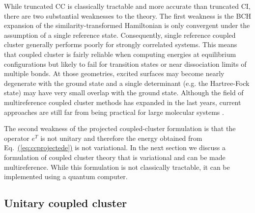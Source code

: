 \documentclass[superscriptaddress,aps,pra,twocolumn,nofootinbib,babel]{revtex4-1}
\newcommand{\eq}[1]{Eq.~\hyperref[eq:#1]{(\ref*{eq:#1})}}
\begin{document}
While truncated CC is classically tractable and more accurate than truncated CI, there are two substantial weaknesses to the theory. The first weakness is the BCH expansion of the similarity-transformed Hamiltonian is only convergent under the assumption of a single reference state. Consequently, single reference coupled cluster generally performs poorly for strongly correlated systems. This means that coupled cluster is fairly reliable when computing energies at equilibrium configurations but likely to fail for transition states or near dissociation limits of multiple bonds. At those geometries, excited surfaces may become nearly degenerate with the ground state and a single determinant (e.g. the Hartree-Fock state) may have very small overlap with the ground state. Although the field of multireference coupled cluster methods has expanded in the last years, current approaches are still far from being practical for large molecular systems \cite{Lyakh.CR.112.182.2011}.

The second weakness of the projected coupled-cluster formulation is that the operator $e^{T}$ is not unitary and therefore the energy obtained from \eq{ccprojectede} is not variational. In the next section we discuss a formulation of coupled cluster theory that is variational and can be made multireference. While this formulation is not classically tractable, it can be implemented using a quantum computer.

\subsection{Unitary coupled cluster}
\end{document}
